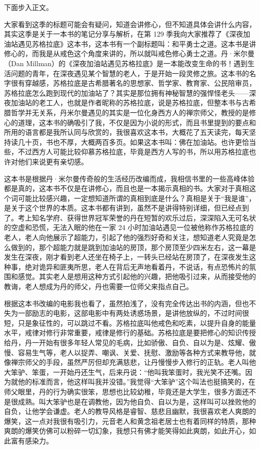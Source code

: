 下面步入正文。

大家看到这季的标题可能会有疑问，知道会讲修心，但不知道具体会讲什么内容，其实这季是关于一本书的笔记分享与解析，在第 129 季我向大家推荐了《深夜加油站遇见苏格拉底》这本书，这本书有一个副标题叫：和平勇士之道。这本书是讲修心的，而我是从戒色这个角度来讲的，所以就叫戒色修心勇士之道。丹·米尔曼（Dan Millman）的《深夜加油站遇见苏格拉底》是一本能改变生命的书！遇到生活问题的青年，在深夜遇见某个智慧的老人，于是开始一段灵修之旅。这本书的名字很有穿越感，苏格拉底是古希腊著名的思想家、哲学家、教育家、公民陪审员，苏格拉底怎么跑到现代的加油站了？其实是那位拥有神秘智慧的强悍怪老头——深夜加油站的老工人，也就是作者昵称的苏格拉底，说是苏格拉底，但整本书与古希腊哲学并无关系，丹米尔曼遇见的其实是一位化身西方人的禅宗师父，教授的是修心的道理，这本书的确吸引了我，不仅是因为小说的形式，而且书里提到的要点和所用的语言都是我所认同与欣赏的，我很喜欢这本书，大概花了五天读完，每天坚持读几十页，书也不厚，大概两百多页。如果这本书叫：佛在加油站。也许更恰当些，不过西方人可能比较仰慕苏格拉底，毕竟是西方人写的书，所以用苏格拉底也许对他们来说更有亲切感。

这本书是根据丹·米尔曼传奇般的生活经历改编而成，我相信书里的一些高峰体验都是真的，这本书不仅是在讲修心，而且也是一本揭示真相的书。大家对于真相这个词可能比较感兴趣，一定想知道所谓的真相到底是什么？真相是关于“我是谁”，是关于这个世界的本质。这本书都有讲到，虽然不是讲得特别详细，但已经点到了。考上知名学府、获得世界冠军荣誉的丹在短暂的欢乐过后，深深陷入无可名状的空虚和恐慌，无法入眠的他在一家 24 小时加油站遇见一位被他称作苏格拉底的老人，老人向他展示了超能力，引起了他的强烈好奇和关注，想知道老人究竟是怎么做到的，那个超能力就是跳到加油站的房顶，那个房顶至少四米左右，这一幕是发生在深夜，刚才看到老人还坐在椅子上，一转头已经站在房顶了，在深夜发生这种事，绝对诡异和匪夷所思，老人在背后无声地看着丹，不说话，有点恐怖片的氛围和感觉。其实老人是想用这种方式引起他的兴趣，把他吸引过来，从而接受他的教诲，老人想成为丹的师父，丹也需要一位师父来指点自己。

根据这本书改编的电影我也看了，虽然拍浅了，没有完全传达出书的内涵，但也不失为一部励志的电影，这部电影中有两处诱惑场景，是讲他放纵的，不过时间很短，只是象征性的，可以跳过不看。苏格拉底叫他戒色和吃素，以提升自身的能量水平，戒律对修行非常重要，戒律是修行的基础。苏格拉底是要把修心的知识传授给丹，丹一开始有很多年轻人常见的毛病，比如骄傲、自负、自以为是、炫耀、傲慢、容易生气等，老人以捉弄、嘲讽、关爱、抚慰、激励等各种方式来教导他，就像禅宗师父的手段，虽然严厉但却充满慈悲，让丹慢慢步入修行的正轨。老人叫他大笨驴、笨蛋，一开始丹还生气，后来丹说：“他叫我笨蛋时，我光笑不还嘴。因为就他的标准而言，他这样叫我并没错。”我觉得“大笨驴”这个叫法也挺搞笑的，在师父眼里，丹的行为确实很笨，思想也比较幼稚，毕竟还是大学生，很多方面还不是很成熟。叫大笨驴也是在调教他，因为他自负、自以为是，这样叫可以挫败他的自负，让他学会谦虚。老人的教导风格是睿智、慈悲且幽默，我很喜欢老人爽朗的爆笑，这一点对我很有吸引力，元音老人和黄念祖老居士也有着同样的特质，那种爽朗的爆笑仿佛可以粉碎一切幻象，我想只有佛才能笑得如此爽朗，如此开心，如此富有感染力。

